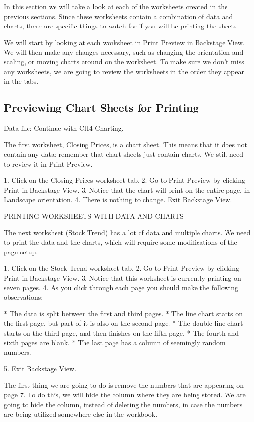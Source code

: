 In this section we will take a look at each of the worksheets created in the previous sections. Since
these worksheets contain a combination of data and charts, there are specific things to watch for if
you will be printing the sheets.

We will start by looking at each worksheet in Print Preview in Backstage View. We will then make
any changes necessary, such as changing the orientation and scaling, or moving charts around on the
worksheet. To make sure we don’t miss any worksheets, we are going to review the worksheets in the
order they appear in the tabs.

\subsection{Previewing Chart Sheets for Printing}

Data file: Continue with CH4 Charting.

The first worksheet, Closing Prices, is a chart sheet. This means that it does not contain any data;
remember that chart sheets just contain charts. We still need to review it in Print Preview.

1.   Click on the Closing Prices worksheet tab.
2.   Go to Print Preview by clicking Print in Backstage View.
3.   Notice that the chart will print on the entire page, in Landscape orientation.
4.   There is nothing to change. Exit Backstage View.

PRINTING WORKSHEETS WITH DATA AND CHARTS

The next worksheet (Stock Trend) has a lot of data and multiple charts. We need to print the data and
the charts, which will require some modifications of the page setup.

1.   Click on the Stock Trend worksheet tab.
2.   Go to Print Preview by clicking Print in Backstage View.
3.   Notice that this worksheet is currently printing on seven pages.
4.   As you click through each page you should make the following observations:


* The data is split between the first and third pages.
* The line chart starts on the first page, but part of it is also on the second page.
* The double-line chart starts on the third page, and then finishes on the fifth page.
* The fourth and sixth pages are blank.
* The last page has a column of seemingly random numbers.

5. Exit Backstage View.

The first thing we are going to do is remove the numbers that are appearing on page 7. To do this,
we will hide the column where they are being stored. We are going to hide the column, instead of
deleting the numbers, in case the numbers are being utilized somewhere else in the workbook.

